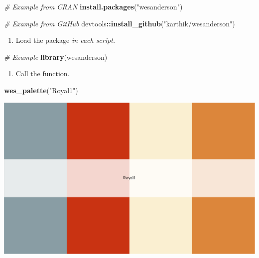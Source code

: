 \documentclass[
]{book}
\newenvironment{Shaded}{\begin{snugshade}}{\end{snugshade}}
\newcommand{\CommentTok}[1]{\textcolor[rgb]{0.56,0.35,0.01}{\textit{#1}}}
\newcommand{\KeywordTok}[1]{\textcolor[rgb]{0.13,0.29,0.53}{\textbf{#1}}}
\newcommand{\NormalTok}[1]{#1}
\newcommand{\OperatorTok}[1]{\textcolor[rgb]{0.81,0.36,0.00}{\textbf{#1}}}
\newcommand{\StringTok}[1]{\textcolor[rgb]{0.31,0.60,0.02}{#1}}
\providecommand{\tightlist}{%
  \setlength{\itemsep}{0pt}\setlength{\parskip}{0pt}}
\begin{document}
\begin{Shaded}
\begin{Highlighting}[]
\CommentTok{# Example from CRAN}
\KeywordTok{install.packages}\NormalTok{(}\StringTok{"wesanderson"}\NormalTok{)}

\CommentTok{# Example from GitHub}
\NormalTok{devtools}\OperatorTok{::}\KeywordTok{install_github}\NormalTok{(}\StringTok{"karthik/wesanderson"}\NormalTok{)}
\end{Highlighting}
\end{Shaded}

\begin{enumerate}
\def\labelenumi{\arabic{enumi}.}
\setcounter{enumi}{1}
\tightlist
\item
  Load the package \emph{in each script.}
\end{enumerate}

\begin{Shaded}
\begin{Highlighting}[]
\CommentTok{# Example}
\KeywordTok{library}\NormalTok{(wesanderson)}
\end{Highlighting}
\end{Shaded}

\begin{enumerate}
\def\labelenumi{\arabic{enumi}.}
\setcounter{enumi}{2}
\tightlist
\item
  Call the function.
\end{enumerate}

\begin{Shaded}
\begin{Highlighting}[]
\KeywordTok{wes_palette}\NormalTok{(}\StringTok{"Royal1"}\NormalTok{)}
\end{Highlighting}
\end{Shaded}

\includegraphics{figures/unnamed-chunk-206-1.pdf}
\end{document}
